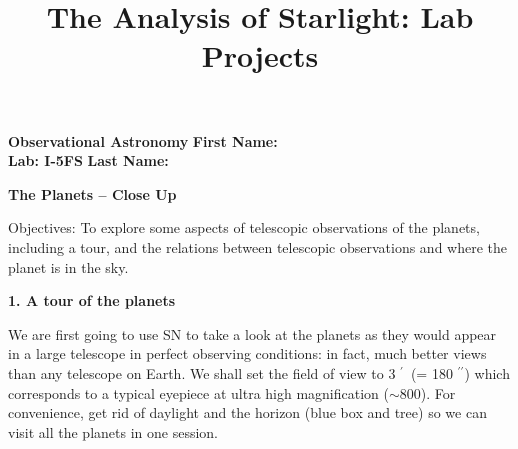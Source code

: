 \documentclass[12pt]{article}
\title{The Analysis of Starlight: Lab Projects}
\begin{document}
\setcounter{page}{1}
\setcounter{equation}{0}
\pagestyle{plain}
\thispagestyle{empty}  %
\newcommand{\kms}{\hbox{km\,s$^{\rm -1}$}}
\def\lo {\ifmmode {\,{\it L}\solar} \else $\,L$\solar\fi}       %
\def\my {\ifmmode {\,{\it M}\solar\,{\rm yr^{-1}}}              %
        \else {$\,M$\solar$\,$yr$^{\rm -1}$}\fi}
\def\arcsec{\ifmmode {^{\scriptscriptstyle\prime\prime}}
          \else $^{\scriptscriptstyle\prime\prime}$\fi}
\def\arcmin{\ifmmode {^{\scriptscriptstyle\prime}}
          \else $^{\scriptscriptstyle\prime}$\fi}
\def\deg{\ifmmode^\circ\else$^\circ$\fi}







\noindent
{\bf Observational Astronomy    \hfill} {\bf First Name:\makebox[4cm]{\hrulefill}}\\
{\bf Lab: I-5FS} \hfill {\bf Last Name:\makebox[4cm]{\hrulefill}}


\bigskip

\medskip

\noindent
{\hfill \Large {\bf The Planets -- Close Up} \hfill}


\bigskip

\noindent
{Objectives:} To explore some aspects of telescopic observations of
the planets, including a tour, and the relations between telescopic
observations and where the planet is in the sky.

\medskip
\bigskip
\noindent
{\bf 1. A tour of the planets}

\medskip
\noindent
We are first going to use SN to take a look at the planets as they
would appear in a large telescope in perfect observing conditions: in
fact, much better views than any telescope on Earth. We shall set the
field of view to 3\arcmin\ (= 180\arcsec) which corresponds to a
typical eyepiece at ultra high magnification ($\sim 800$).  For
convenience, get rid of daylight and the horizon (blue box and tree)
so we can visit all the planets in one session. 
\end{document}
